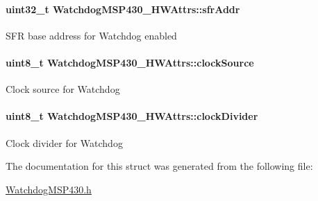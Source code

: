 \paragraph[{sfr\+Addr}]{\setlength{\rightskip}{0pt plus 5cm}uint32\+\_\+t Watchdog\+M\+S\+P430\+\_\+\+H\+W\+Attrs\+::sfr\+Addr}\label{struct_watchdog_m_s_p430___h_w_attrs_a763f95534b160827a7c199ddab02a6b9}
S\+F\+R base address for Watchdog enabled 
\paragraph[{clock\+Source}]{\setlength{\rightskip}{0pt plus 5cm}uint8\+\_\+t Watchdog\+M\+S\+P430\+\_\+\+H\+W\+Attrs\+::clock\+Source}\label{struct_watchdog_m_s_p430___h_w_attrs_a7b0d9bd3ef04e58530c19312621b05a2}
Clock source for Watchdog 
\paragraph[{clock\+Divider}]{\setlength{\rightskip}{0pt plus 5cm}uint8\+\_\+t Watchdog\+M\+S\+P430\+\_\+\+H\+W\+Attrs\+::clock\+Divider}\label{struct_watchdog_m_s_p430___h_w_attrs_a405ce3d2556166a841de62f207ce8675}
Clock divider for Watchdog 

The documentation for this struct was generated from the following file\+:\begin{DoxyCompactItemize}
\item 
\hyperlink{_watchdog_m_s_p430_8h}{Watchdog\+M\+S\+P430.\+h}\end{DoxyCompactItemize}
